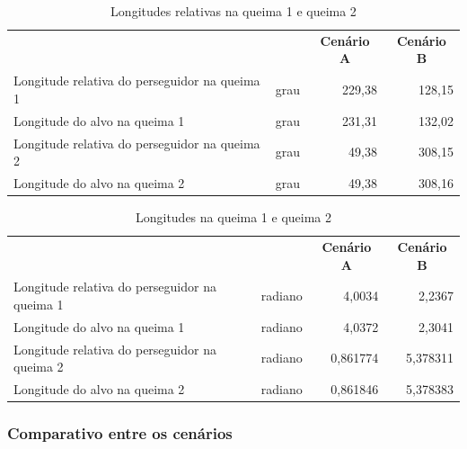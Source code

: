 \begin{table}[H]
\centering
\caption{Longitudes relativas na queima 1 e queima 2}
\begin{tabularx}{\linewidth}{|>{\raggedright\arraybackslash}X|
                             >{\raggedright\arraybackslash}c|
                             r|r|}
\hline
\multicolumn{1}{|c|}{\textbf{Variável}} &
\multicolumn{1}{c|}{\textbf{Unidade}} &
\multicolumn{1}{c|}{\textbf{Cenário A}} &
\multicolumn{1}{c|}{\textbf{Cenário B}} \\
\hhline{|=|=|=|=|}
Longitude relativa do perseguidor na queima 1 & grau & 229,38 & 128,15 \\
\hline
Longitude do alvo na queima 1        & grau & 231,31 & 132,02 \\
\hline
Longitude relativa do perseguidor na queima 2 & grau & 49,38  & 308,15 \\
\hline
Longitude do alvo na queima 2        & grau & 49,38  & 308,16 \\
\hline
\end{tabularx}
\label{tab_cap4_longitudes_queimas}
\end{table}

\begin{table}[H]
\centering
\caption{Longitudes na queima 1 e queima 2}
\begin{tabularx}{\linewidth}{|>{\raggedright\arraybackslash}X|
                             >{\raggedright\arraybackslash}c|
                             r|r|}
\hline
\multicolumn{1}{|c|}{\textbf{Variável}} &
\multicolumn{1}{c|}{\textbf{Unidade}} &
\multicolumn{1}{c|}{\textbf{Cenário A}} &
\multicolumn{1}{c|}{\textbf{Cenário B}} \\
\hhline{|=|=|=|=|}
Longitude relativa do perseguidor na queima 1 & radiano & 4,0034   & 2,2367   \\
\hline
Longitude do alvo na queima 1        & radiano & 4,0372   & 2,3041   \\
\hline
Longitude relativa do perseguidor na queima 2 & radiano & 0,861774 & 5,378311 \\
\hline
Longitude do alvo na queima 2        & radiano & 0,861846 & 5,378383 \\
\hline
\end{tabularx}
\label{tab_cap4_longitudes_queimas_rad}
\end{table}

\subsubsection{Comparativo entre os cenários}

